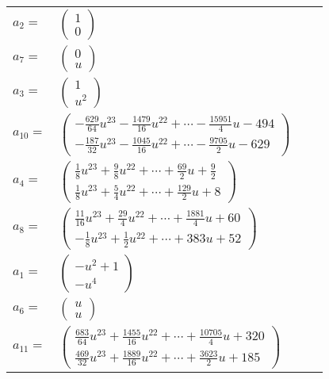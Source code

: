 \documentclass[1p]{elsarticle_modified}
\theoremstyle{definition}
\begin{document}
\begin{tabular}{m{7pt} m{180pt} m{7pt} m{180pt} }
\flushright $a_{2}=$&$\begin{pmatrix}1\\0\end{pmatrix}$ \\
\flushright $a_{7}=$&$\begin{pmatrix}0\\u\end{pmatrix}$ \\
\flushright $a_{3}=$&$\begin{pmatrix}1\\u^2\end{pmatrix}$ \\
\flushright $a_{10}=$&$\begin{pmatrix}-\frac{629}{64} u^{23}-\frac{1479}{16} u^{22}+\cdots-\frac{15951}{4} u-494\\-\frac{187}{32} u^{23}-\frac{1045}{16} u^{22}+\cdots-\frac{9705}{2} u-629\end{pmatrix}$ \\
\flushright $a_{4}=$&$\begin{pmatrix}\frac{1}{8} u^{23}+\frac{9}{8} u^{22}+\cdots+\frac{69}{2} u+\frac{9}{2}\\\frac{1}{8} u^{23}+\frac{5}{4} u^{22}+\cdots+\frac{129}{2} u+8\end{pmatrix}$ \\
\flushright $a_{8}=$&$\begin{pmatrix}\frac{11}{16} u^{23}+\frac{29}{4} u^{22}+\cdots+\frac{1881}{4} u+60\\-\frac{1}{8} u^{23}+\frac{1}{2} u^{22}+\cdots+383 u+52\end{pmatrix}$ \\
\flushright $a_{1}=$&$\begin{pmatrix}- u^2+1\\- u^4\end{pmatrix}$ \\
\flushright $a_{6}=$&$\begin{pmatrix}u\\u\end{pmatrix}$ \\
\flushright $a_{11}=$&$\begin{pmatrix}\frac{683}{64} u^{23}+\frac{1455}{16} u^{22}+\cdots+\frac{10705}{4} u+320\\\frac{469}{32} u^{23}+\frac{1889}{16} u^{22}+\cdots+\frac{3623}{2} u+185\end{pmatrix}$ \\

\end{tabular}
\end{document}
